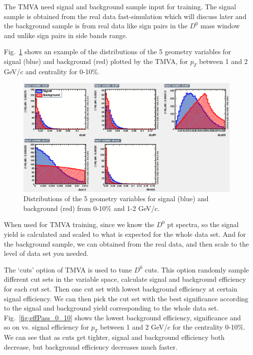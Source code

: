 The TMVA need signal and background sample input for training. The signal sample is obtained from the real data fast-simulation which will discuss later and the background sample is from real data like sign pairs in the $D^0$ mass window and unlike sign pairs in side bands range. 

Fig.~\ref{fig:variables_0_10} shows an example of the distributions of the 5 geometry variables for signal (blue) and background (red) plotted by the TMVA, for $p_T$ between 1 and 2 GeV/$c$ and centrality for 0-10\%.

\begin{figure}[htbp]
\centering
\includegraphics[keepaspectratio,width=1.0\textwidth]{figure/Run14_D0HFT/variables_id_c1_0_10.eps}
\caption{Distributions of the 5 geometry variables for signal (blue) and background (red) from 0-10\% and 1-2 GeV/c.}
\label{fig:variables_0_10}
\end{figure}

When used for TMVA training, since we know the $D^0$ pt spectra, so the signal yield is calculated and scaled to what is expected for the whole data set. And for the background sample, we can obtained from the real data, and then scale to the level of data set you needed.

The `cuts' option of TMVA is used to tune $D^0$ cuts. This option randomly sample different cut sets in the variable space, calculate signal and background efficiency for each cut set. Then one cut set with lowest background efficiency at certain signal efficiency. We can then pick the cut set with the best significance according to the signal and background yield corresponding to the whole data set. Fig.~\ref{fig:effPass_0_10} shows the lowest background efficiency, significance and so on vs. signal efficiency for $p_T$ between 1 and 2 GeV/$c$ for the centrality 0-10\%. We can see that as cuts get tighter, signal and background efficiency both decrease, but background efficiency decreases much faster.


